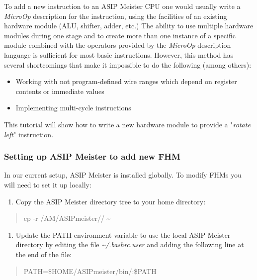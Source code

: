 \documentclass[
]{article}
\begin{document}
To add a new instruction to an ASIP Meister CPU one would usually write
a \emph{MicroOp} description for the instruction, using the facilities
of an existing hardware module (ALU, shifter, adder, etc.) The ability
to use multiple hardware modules during one stage and to create more
than one instance of a specific module combined with the operators
provided by the \emph{MicroOp} description language is sufficient for
most basic instructions. However, this method has several shortcomings
that make it impossible to do the following (among others):

\begin{itemize}
\item
  Working with not program-defined wire ranges which depend on register
  contents or immediate values
\item
  Implementing multi-cycle instructions
\end{itemize}

This tutorial will show how to write a new hardware module to provide a
"\emph{rotate left}" instruction.

\hypertarget{setting-up-asip-meister-to-add-new-fhm}{%
\subsubsection{Setting up ASIP Meister to add new
FHM}\label{setting-up-asip-meister-to-add-new-fhm}}

In our current setup, ASIP Meister is installed globally. To modify FHMs
you will need to set it up locally:

\begin{enumerate}
\def\labelenumi{\arabic{enumi}.}
\item
  Copy the ASIP Meister directory tree to your home directory:
\end{enumerate}

\begin{quote}
cp -r /AM/ASIPmeister// \textasciitilde{}
\end{quote}

\begin{enumerate}
\def\labelenumi{\arabic{enumi}.}
\setcounter{enumi}{1}
\item
  Update the PATH environment variable to use the local ASIP Meister
  directory by editing the file \emph{\textasciitilde/.bashrc.user} and
  adding the following line at the end of the file:
\end{enumerate}

\begin{quote}
PATH=\$HOME/ASIPmeister/bin/:\$PATH
\end{quote}
\end{document}
